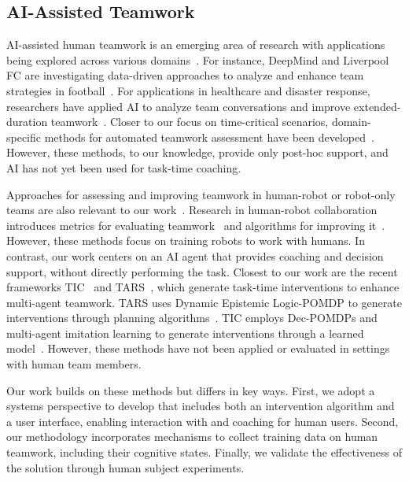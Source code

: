 \subsection{AI-Assisted Teamwork}
AI-assisted human teamwork is an emerging area of research with applications being explored across various domains~\cite{kamar2009incorporating, rajvsp2020systematic, seo2021towards, pynadath2023effectiveness, pynadath2023improving, van2023markov, seo2024ai, harari2024deep}. For instance, DeepMind and Liverpool FC are investigating data-driven approaches to analyze and enhance team strategies in football~\cite{tuyls2021game}. For applications in healthcare and disaster response, researchers have applied AI to analyze team conversations and improve extended-duration teamwork~\cite{kim2016improving, amir2016mutual}. Closer to our focus on time-critical scenarios, domain-specific methods for automated teamwork assessment have been developed~\cite{granaasen2019towards, kotlyar2023assessing}. However, these methods, to our knowledge, provide only post-hoc support, and AI has not yet been used for task-time coaching.

Approaches for assessing and improving teamwork in human-robot or robot-only teams are also relevant to our work~\cite{riley2004advice, riley2002empirical, wu2022evaluating, thomaz2016computational, unhelkar2016contact}. Research in human-robot collaboration introduces metrics for evaluating teamwork~\cite{hoffman2019evaluating, ma2022metrics, norton2022metrics} and algorithms for improving it~\cite{buisan2021human, semeraro2023human, mukherjee2022survey, nikolaidis2017human, unhelkar2020decision}. However, these methods focus on training robots to work with humans. In contrast, our work centers on an AI agent that provides coaching and decision support, without directly performing the task.
Closest to our work are the recent frameworks TIC~\cite{seo2023automated} and TARS~\cite{zhang2024risk}, which generate task-time interventions to enhance multi-agent teamwork. TARS uses Dynamic Epistemic Logic-POMDP to generate interventions through planning algorithms~\cite{zhang2024risk}. TIC employs Dec-POMDPs and multi-agent imitation learning to generate interventions through a learned model~\cite{seo2023automated,seo2022semi}. However, these methods have not been applied or evaluated in settings with human team members.

Our work builds on these methods but differs in key ways. First, we adopt a systems perspective to develop \coach that includes both an intervention algorithm and a user interface, enabling interaction with and coaching for human users. Second, our methodology incorporates mechanisms to collect training data on human teamwork, including their cognitive states. Finally, we validate the effectiveness of the solution through human subject experiments.
